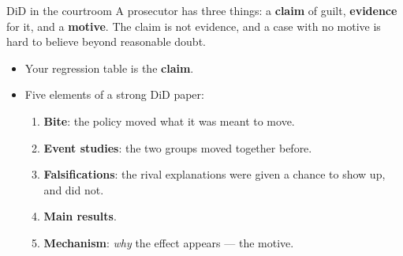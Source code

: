 \documentclass[
  11pt,
  ignorenonframetext,
  aspectratio=169,
]{beamer}
\providecommand{\tightlist}{%
  \setlength{\itemsep}{0pt}\setlength{\parskip}{0pt}}
\begin{document}
\begin{frame}{DiD in the courtroom}
\protect{}\label{did-in-the-courtroom}
A prosecutor has three things: a \textbf{claim} of guilt,
\textbf{evidence} for it, and a \textbf{motive}. The claim is not
evidence, and a case with no motive is hard to believe beyond reasonable
doubt.

\begin{itemize}
\tightlist
\item
  Your regression table is the \textbf{claim}.
\item
  Five elements of a strong DiD paper:

  \begin{enumerate}
  \tightlist
  \item
    \textbf{Bite}: the policy moved what it was meant to move.
  \item
    \textbf{Event studies}: the two groups moved together before.
  \item
    \textbf{Falsifications}: the rival explanations were given a chance
    to show up, and did not.
  \item
    \textbf{Main results}.
  \item
    \textbf{Mechanism}: \emph{why} the effect appears --- the motive.
  \end{enumerate}
\end{itemize}
\end{frame}
\end{document}
